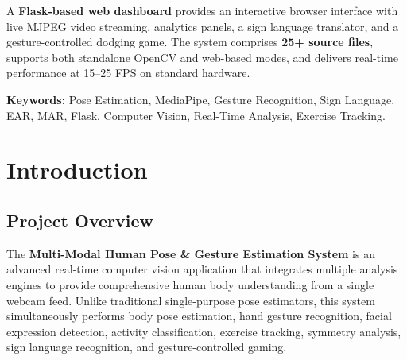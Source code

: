 \documentclass[a4paper,12pt]{report}
\begin{document}
\par
A \textbf{Flask-based web dashboard} provides an interactive browser interface with live MJPEG video streaming, analytics panels, a sign language translator, and a gesture-controlled dodging game. The system comprises \textbf{25+ source files}, supports both standalone OpenCV and web-based modes, and delivers real-time performance at 15--25 FPS on standard hardware.

\par
\textbf{Keywords:} Pose Estimation, MediaPipe, Gesture Recognition, Sign Language, EAR, MAR, Flask, Computer Vision, Real-Time Analysis, Exercise Tracking.

\makeatletter
\let\l@table\l@figure
\renewcommand\listoffigures{%
    \section*{\listfigurename}%
    \@mkboth{\MakeUppercase\listfigurename}{\MakeUppercase\listfigurename}%
    \@starttoc{lof}%
}
\renewcommand\listoftables{%
    \section*{\listtablename}%
    \@mkboth{\MakeUppercase\listtablename}{\MakeUppercase\listtablename}%
    \@starttoc{lot}%
}
\makeatother

\clearpage
{}

\renewcommand{\contentsname}{Table of Contents}
\tableofcontents
\clearpage
\listoffigures
\clearpage
\listoftables

\clearpage
{}

\chapter{Introduction}
\thispagestyle{contentpages}
\justifying

\section{Project Overview}
The \textbf{Multi-Modal Human Pose \& Gesture Estimation System} is an advanced real-time computer vision application that integrates multiple analysis engines to provide comprehensive human body understanding from a single webcam feed. Unlike traditional single-purpose pose estimators, this system simultaneously performs body pose estimation, hand gesture recognition, facial expression detection, activity classification, exercise tracking, symmetry analysis, sign language recognition, and gesture-controlled gaming.
\end{document}
